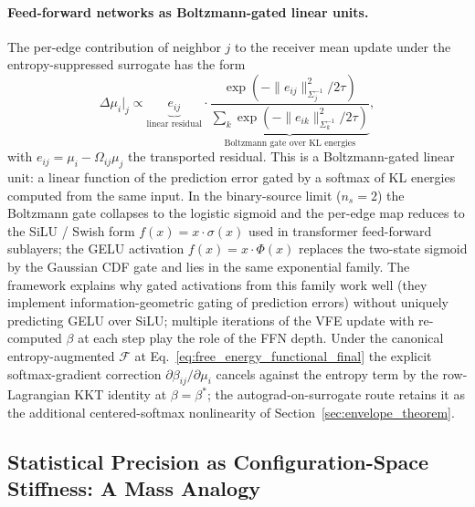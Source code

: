 \documentclass[11pt]{article}
\begin{document}
\paragraph{Feed-forward networks as Boltzmann-gated linear units.}
The per-edge contribution of neighbor $j$ to the receiver mean update under the entropy-suppressed surrogate has the form
\begin{equation}
\Delta\mu_i\big|_j \propto \underbrace{e_{ij}}_{\text{linear residual}} \cdot \underbrace{\frac{\exp(-\|e_{ij}\|^2_{\Sigma_j^{-1}} / 2\tau)}{\sum_k \exp(-\|e_{ik}\|^2_{\Sigma_k^{-1}}/2\tau)}}_{\text{Boltzmann gate over KL energies}},
\label{eq:vfe_glu}
\end{equation}
with $e_{ij} = \mu_i - \Omega_{ij}\mu_j$ the transported residual. This is a Boltzmann-gated linear unit: a linear function of the prediction error gated by a softmax of KL energies computed from the same input. In the binary-source limit ($n_s = 2$) the Boltzmann gate collapses to the logistic sigmoid and the per-edge map reduces to the SiLU / Swish form $f(x) = x\cdot\sigma(x)$ used in transformer feed-forward sublayers; the GELU activation $f(x) = x\cdot\Phi(x)$ replaces the two-state sigmoid by the Gaussian CDF gate and lies in the same exponential family. The framework explains why gated activations from this family work well (they implement information-geometric gating of prediction errors) without uniquely predicting GELU over SiLU; multiple iterations of the VFE update with re-computed $\beta$ at each step play the role of the FFN depth. Under the canonical entropy-augmented $\mathcal{F}$ at Eq.~\eqref{eq:free_energy_functional_final} the explicit softmax-gradient correction $\partial\beta_{ij}/\partial\mu_i$ cancels against the entropy term by the row-Lagrangian KKT identity at $\beta = \beta^*$; the autograd-on-surrogate route retains it as the additional centered-softmax nonlinearity of Section~\ref{sec:envelope_theorem}.

\subsection{Statistical Precision as Configuration-Space Stiffness: A Mass Analogy}
\label{sec:mass}
\end{document}
